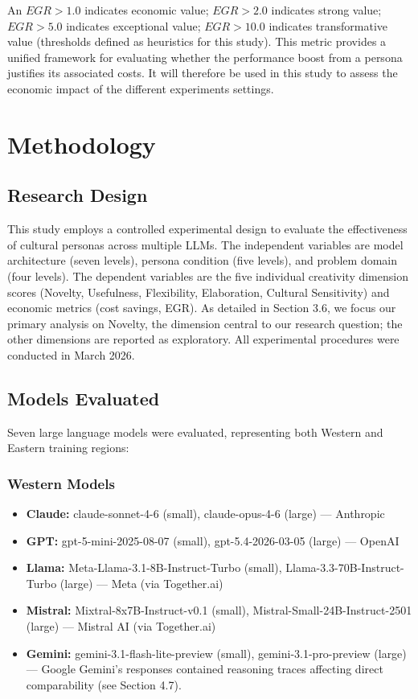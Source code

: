 \documentclass{article}
\begin{document}
An $EGR > 1.0$ indicates economic value; $EGR > 2.0$ indicates strong value; $EGR > 5.0$ indicates exceptional value; $EGR > 10.0$ indicates transformative value (thresholds defined as heuristics for this study). This metric provides a unified framework for evaluating whether the performance boost from a persona justifies its associated costs. It will therefore be used in this study to assess the economic impact of the different experiments settings.

\section{Methodology}

\subsection{Research Design}

This study employs a controlled experimental design to evaluate the effectiveness of cultural personas across multiple LLMs. The independent variables are model architecture (seven levels), persona condition (five levels), and problem domain (four levels). The dependent variables are the five individual creativity dimension scores (Novelty, Usefulness, Flexibility, Elaboration, Cultural Sensitivity) and economic metrics (cost savings, EGR). As detailed in Section 3.6, we focus our primary analysis on Novelty, the dimension central to our research question; the other dimensions are reported as exploratory. All experimental procedures were conducted in March 2026.

\subsection{Models Evaluated}

Seven large language models were evaluated, representing both Western and Eastern training regions:

\subsubsection{Western Models}
\begin{itemize}
    \item \textbf{Claude:} claude-sonnet-4-6 (small), claude-opus-4-6 (large) — Anthropic
    \item \textbf{GPT:} gpt-5-mini-2025-08-07 (small), gpt-5.4-2026-03-05 (large) — OpenAI
    \item \textbf{Llama:} Meta-Llama-3.1-8B-Instruct-Turbo (small), Llama-3.3-70B-Instruct-Turbo (large) — Meta (via Together.ai)
    \item \textbf{Mistral:} Mixtral-8x7B-Instruct-v0.1 (small), Mistral-Small-24B-Instruct-2501 (large) — Mistral AI (via Together.ai)
    \item \textbf{Gemini:} gemini-3.1-flash-lite-preview (small), gemini-3.1-pro-preview (large) — Google \footnotesize Gemini's responses contained reasoning traces affecting direct comparability (see Section 4.7).
\end{itemize}
\end{document}
